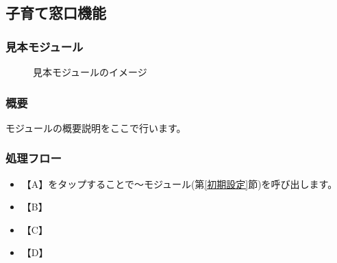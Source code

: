 \documentclass[a4j]{jarticle}
\begin{document}
\subsection{子育て窓口機能}
\subsubsection{見本モジュール\label{見本}} %
\begin{figure}[H]
    \begin{center}
    \caption {見本モジュールのイメージ}
    \label{functionselection}
    \end{center}
\end{figure}


\subsubsection*{概要}
モジュールの概要説明をここで行います。
\subsubsection*{処理フロー}
\begin{itemize}
\item 【A】をタップすることで～モジュール(第\ref{初期設定}節)を呼び出します。%
\item 【B】
\item 【C】
\item 【D】
\end{itemize}
\end{document}
